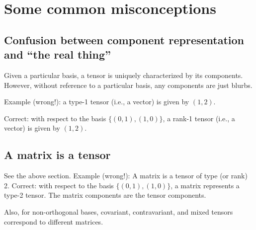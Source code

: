 \section{Some common misconceptions}

\subsection{Confusion between component representation and ``the real thing''}
Given a particular basis, a tensor is uniquely characterized by its components.
However, without reference to a particular basis, any components are just blurbs.

Example (wrong!): a type-1 tensor (i.e., a vector) is given by
$(1,2)$.

Correct: with respect to the basis $\{(0,1),(1,0)\}$,  a rank-1 tensor (i.e., a vector) is given by
$(1,2)$.


\subsection{A matrix is a tensor}

See the above section.
{
\color{blue}
\bexample
Example (wrong!): A matrix is  a  tensor of type (or rank) 2.
\eexample
}
Correct: with respect to the basis $\{(0,1),(1,0)\}$,  a matrix represents a type-2 tensor.
The matrix components are the tensor components.

Also, for non-orthogonal bases, covariant, contravariant, and mixed tensors correspond to different matrices.


\begin{center}
{\color{olive}   \Huge
\floweroneright
}
\end{center}


